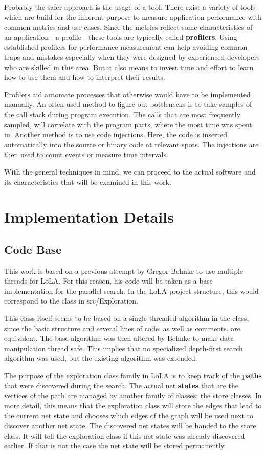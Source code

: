 Probably the safer approach is the usage of a tool. There exist a variety of tools which are build for the inherent purpose to measure application performance with common metrics and use cases. Since the metrics reflect some characteristics of an application - a profile - these tools are typically called \textbf{profilers}. Using established profilers for performance measurement can help avoiding common traps and mistakes especially when they were designed by experienced developers who are skilled in this area. But it also means to invest time and effort to learn how to use them and how to interpret their results.

Profilers aid automate processes that otherwise would have to be implemented manually. An often used method to figure out bottlenecks is to take samples of the call stack during program execution. The calls that are most frequently sampled, will correlate with the program parts, where the most time was spent in. Another method is to use code injections. Here, the code is inserted automatically into the source or binary code at relevant spots. The injections are then used to count events or measure time intervals.

With the general techniques in mind, we can proceed to the actual software and its characteristics that will be examined in this work.

\section{Implementation Details}
\subsection{Code Base}
\label{codeBase}
This work is based on a previous attempt by Gregor Behnke to use multiple threads for LoLA. For this reason, his code will be taken as a base implementation for the parallel search. In the LoLA project structure, this would correspond to the  class in src/Exploration.

This class itself seems to be based on a single-threaded algorithm in the  class, since the basic structure and several lines of code, as well as comments, are equivalent. The base algorithm was then altered by Behnke to make data manipulation thread safe. This implies that no specialized depth-first search algorithm was used, but the existing algorithm was extended.

The purpose of the exploration class family in LoLA is to keep track of the \textbf{paths} that were discovered during the search. The actual net \textbf{states} that are the vertices of the path are managed by another family of classes: the store classes. In more detail, this means that the exploration class will store the edges that lead to the current net state and chooses which edges of the graph will be used next to discover another net state. The discovered net states will be handed to the store class. It will tell the exploration class if this net state was already discovered earlier. If that is not the case the net state will be stored permanently

